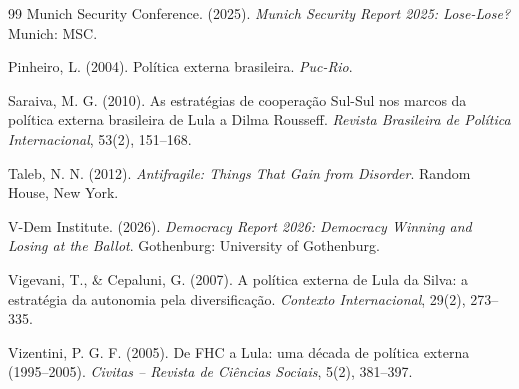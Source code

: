 \documentclass[12pt]{article}
\theoremstyle{definition}
\theoremstyle{remark}
\begin{document}
\begin{thebibliography}{99}
Munich Security Conference. (2025). \textit{Munich Security Report 2025: Lose-Lose?} Munich: MSC.

Pinheiro, L. (2004). Pol\'{i}tica externa brasileira. \textit{Puc-Rio}.

Saraiva, M. G. (2010). As estratégias de coopera\c{c}\~{a}o Sul-Sul nos marcos da pol\'{i}tica externa brasileira de Lula a Dilma Rousseff. \textit{Revista Brasileira de Pol\'{i}tica Internacional}, 53(2), 151--168.

Taleb, N. N. (2012). \textit{Antifragile: Things That Gain from Disorder}. Random House, New York.

V-Dem Institute. (2026). \textit{Democracy Report 2026: Democracy Winning and Losing at the Ballot}. Gothenburg: University of Gothenburg.

Vigevani, T., \& Cepaluni, G. (2007). A pol\'{i}tica externa de Lula da Silva: a estrat\'{e}gia da autonomia pela diversifica\c{c}\~{a}o. \textit{Contexto Internacional}, 29(2), 273--335.

Vizentini, P. G. F. (2005). De FHC a Lula: uma d\'{e}cada de pol\'{i}tica externa (1995--2005). \textit{Civitas -- Revista de Ci\^{e}ncias Sociais}, 5(2), 381--397.

\end{thebibliography}
\end{document}

